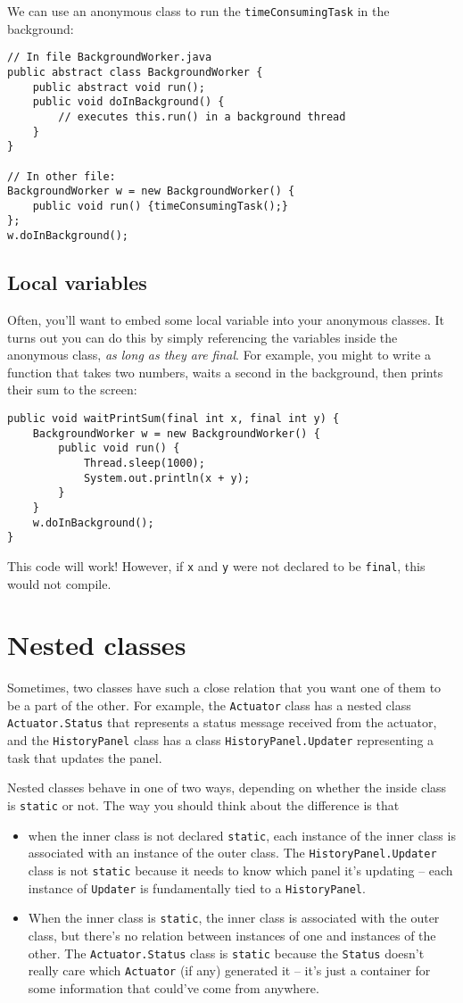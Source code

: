 \documentclass{article}
\begin{document}
We can use an anonymous class to run the \verb!timeConsumingTask! in the background:
\begin{verbatim}
// In file BackgroundWorker.java
public abstract class BackgroundWorker {
    public abstract void run();
    public void doInBackground() {
        // executes this.run() in a background thread
    }
}

// In other file:
BackgroundWorker w = new BackgroundWorker() {
    public void run() {timeConsumingTask();}
};
w.doInBackground();
\end{verbatim}

\subsection{Local variables}
Often, you'll want to embed some local variable into your anonymous classes. It turns out you can do this by simply referencing the variables inside the anonymous class, \emph{as long as they are final}. For example, you might to write a function that takes two numbers, waits a second in the background, then prints their sum to the screen:
\begin{verbatim}
public void waitPrintSum(final int x, final int y) {
    BackgroundWorker w = new BackgroundWorker() {
        public void run() {
            Thread.sleep(1000);
            System.out.println(x + y);
        }
    }
    w.doInBackground();
}
\end{verbatim}
This code will work! However, if \verb!x! and \verb!y! were not declared to be \verb!final!, this would not compile.

\section{Nested classes}
Sometimes, two classes have such a close relation that you want one of them to be a part of the other. For example, the \verb!Actuator! class has a nested class \verb!Actuator.Status! that represents a status message received from the actuator, and the \verb!HistoryPanel! class has a class \verb!HistoryPanel.Updater! representing a task that updates the panel.

Nested classes behave in one of two ways, depending on whether the inside class is \verb!static! or not. The way you should think about the difference is that
\begin{itemize}
\item when the inner class is not declared \verb!static!, each instance of the inner class is associated with an instance of the outer class. The \verb!HistoryPanel.Updater! class is not \verb!static! because it needs to know which panel it's updating -- each instance of \verb!Updater! is fundamentally tied to a \verb!HistoryPanel!.
\item When the inner class is \verb!static!, the inner class is associated with the outer class, but there's no relation between instances of one and instances of the other. The \verb!Actuator.Status! class is \verb!static! because the \verb!Status! doesn't really care which \verb!Actuator! (if any) generated it -- it's just a container for some information that could've come from anywhere.
\end{itemize}
\end{document}
